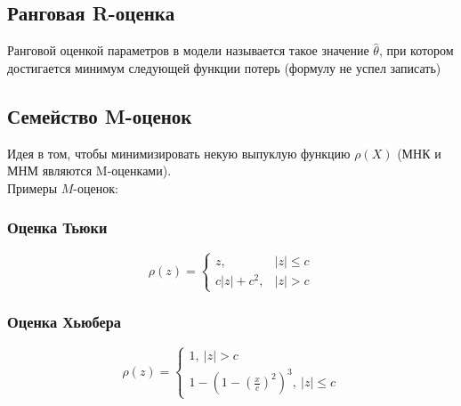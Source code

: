 \documentclass[12pt, a4paper]{article}
\begin{document}
\subsection*{Ранговая R-оценка}
Ранговой оценкой параметров в модели называется такое значение $\hat \theta$, при котором достигается минимум следующей функции потерь (формулу не успел записать)
\subsection*{Семейство M-оценок}
Идея в том, чтобы минимизировать некую выпуклую функцию $\rho(X)$ (МНК и МНМ являются M-оценками).\\
Примеры $M$-оценок:
\subsubsection*{Оценка Тьюки}
\[
\rho(z) = \begin{cases}
    z, & |z| \leq c\\
    c|z| + c^2, & |z| > c
\end{cases}
\]
\subsubsection*{Оценка Хьюбера}
\[
\rho(z) = \begin{cases}
    1,\ |z| > c\\
    1 - {\left( 1 - {\left( \frac{x}{c} \right)}^2 \right)}^3,\ |z| \leq c
\end{cases}
\]
\end{document}
